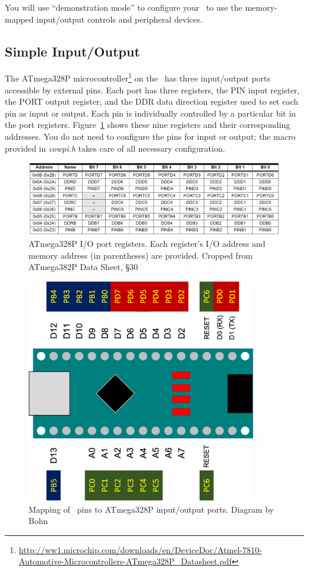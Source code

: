 You will use ``demonstration mode'' to configure your \nano\ to use the
memory-mapped input/output controls and peripheral devices.

\subsection{Simple Input/Output}

The ATmega328P microcontroller\footnote{\url{http://ww1.microchip.com/downloads/en/DeviceDoc/Atmel-7810-Automotive-Microcontrollers-ATmega328P_Datasheet.pdf}}
on the \nano\ has three input/output ports accessible by external pins. Each
port has three registers, the PIN input register, the PORT output register, and
the DDR data direction register used to set each pin as input or output. Each
pin is individually controlled by a particular bit in the port registers.
Figure~\ref{fig:IoPortRegisters} shows these nine registers and their
corresponding addresses.
You do not need to configure the pins for input or output; the
 macro provided in \textit{cowpi.h} takes care of all
necessary configuration.

\begin{figure}
    \centering
    \includegraphics[width=15cm]{IoPortRegisters}
    \caption{ATmega328P I/O port registers. Each register's I/O address and
        memory address (in parentheses) are provided. \tiny Cropped from
        ATmega382P Data Sheet, §30 \label{fig:IoPortRegisters}}
\end{figure}

\begin{figure}[h]
    \centering
    \includegraphics[width=10cm]{NanoPinMapping}
    \caption{Mapping of \nano\ pins to ATmega328P input/output ports. \tiny Diagram by Bohn \label{fig:NanoPinMapping}}
\end{figure}

